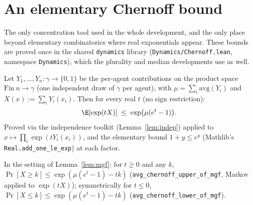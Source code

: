 \section{An elementary Chernoff bound}\label{sec:chernoff}

The only concentration tool used in the whole development, and the only
place beyond elementary combinatorics where real exponentials appear. These
bounds are proved once in the shared \texttt{dynamics} library
(\texttt{Dynamics/Chernoff.lean}, namespace \texttt{Dynamics}), which the
plurality and median developments use as well.

\begin{lemma}\label{lem:mgf}
  \leanok
  Let $Y_1,\dots,Y_n \colon \gamma \to \{0,1\}$ be the per-agent
  contributions on the product space $\mathrm{Fin}\ n \to \gamma$ (one
  independent draw of $\gamma$ per agent), with $\mu=\sum_i\mathrm{avg}(Y_i)$
  and $X(x) := \sum_i Y_i(x_i)$. Then for every real $t$ (no sign
  restriction):
  \[
    \E[\exp(tX)] \;\le\; \exp\bigl(\mu(e^t-1)\bigr).
  \]
  Proved via the independence toolkit (Lemma~\ref{lem:indep}) applied to
  $x \mapsto \prod_i \exp(tY_i(x_i))$, and the elementary bound
  $1+y\le e^y$ (Mathlib's \texttt{Real.add\_one\_le\_exp}) at each factor.
\end{lemma}

\begin{lemma}\label{lem:chernoff}
  \leanok
  In the setting of Lemma~\ref{lem:mgf}: for $t\ge0$ and any $k$,
  $\Pr[X\ge k] \le \exp(\mu(e^t-1)-tk)$ (\texttt{avg\_chernoff\_upper\_of\_mgf}, Markov
  applied to $\exp(tX)$); symmetrically for $t\le0$,
  $\Pr[X\le k] \le \exp(\mu(e^t-1)-tk)$ (\texttt{avg\_chernoff\_lower\_of\_mgf}).
\end{lemma}

